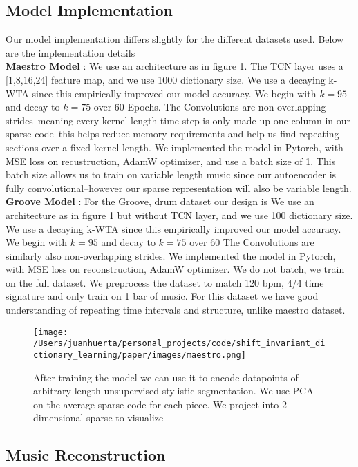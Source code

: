 \documentclass[11pt,a4paper]{article}
\begin{document}
\subsection{Model Implementation}
Our model implementation differs slightly for the different datasets used. Below are the implementation details \\
\textbf{Maestro Model} : We use an architecture as in figure 1. The TCN layer uses a [1,8,16,24] feature map, and we use 1000 dictionary size. We use a decaying k-WTA since this empirically improved our model accuracy. We begin with $k=95$ and decay to $k=75$ over $60$ Epochs. The Convolutions are non-overlapping strides--meaning every kernel-length time step is only made up one column in our sparse code--this helps reduce memory requirements and help us find repeating sections over a fixed kernel length. We implemented the model in Pytorch, with MSE loss on recustruction, AdamW optimizer, and use a batch size of 1. This batch size allows us to train on variable length music since our autoencoder is fully convolutional--however our sparse representation will also be variable length. \\
\textbf{Groove Model}  : For the Groove, drum dataset our design is We use an architecture as in figure 1 but without TCN layer, and we use 100 dictionary size. We use a decaying k-WTA since this empirically improved our model accuracy. We begin with $k=95$ and decay to $k=75$ over $60$ The Convolutions are similarly also non-overlapping strides. We implemented the model in Pytorch, with MSE loss on reconstruction, AdamW optimizer. We do not batch, we train on the full dataset. We  preprocess the dataset to match 120 bpm, 4/4 time signature and only train on 1 bar of music.  For this dataset we have good understanding of repeating time intervals and structure, unlike maestro dataset. 


\begin{figure*}[ht]
  \texttt{[image: /Users/juanhuerta/personal\_projects/code/shift\_invariant\_dictionary\_learning/paper/images/maestro.png]}
  \caption{After training the model we can use it to encode datapoints of arbitrary length unsupervised stylistic segmentation. We use PCA on the average sparse code for each piece. We project into 2 dimensional sparse to visualize }
  \label{fig:boat1}
\end{figure*}


\subsection{Music Reconstruction}
\label{ssec:first}
\end{document}
